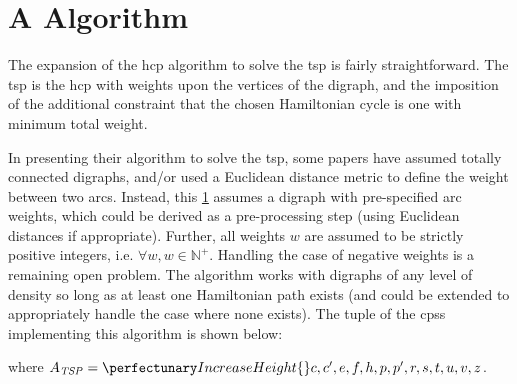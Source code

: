 \section{A   Algorithm}\label{sec:tsp:algotsp}

The expansion of the \gls{hcp} algorithm to solve the \gls{tsp} is fairly straightforward.  The \gls{tsp} is the \gls{hcp} with weights upon the vertices of the digraph, and the imposition of the additional constraint that the chosen Hamiltonian cycle is one with minimum total weight.  

In presenting their algorithm to solve the \gls{tsp}, some papers have assumed totally connected digraphs, and/or used a Euclidean distance metric to define the weight between two arcs.  Instead, this \cref{sec:tsp:algotsp} assumes a digraph with pre-specified arc weights, which could be derived as a pre-processing step (using Euclidean distances if appropriate).   Further, all weights \(w\) are assumed to be strictly positive integers, i.e. \(\forall w, w \in \mathbb{N}^+\).  Handling the case of negative weights is a remaining open problem.  The algorithm works with digraphs of any level of density so long as at least one Hamiltonian path exists (and could be extended to appropriately handle the case where none exists).  The tuple of the \glspl{cps} implementing this algorithm is shown below:

\noindent
where \(A_{\mathit{TSP}} = \cpset{c, c', e, f, h, p, p', r, s, t, u, v, z}\).

